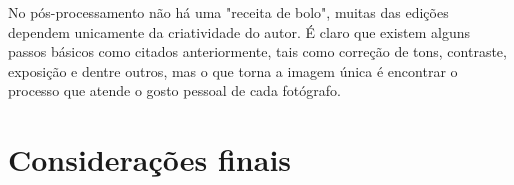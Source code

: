 \documentclass[
	article,			%
	12pt,				%
	oneside,			%
	a4paper,			%
	english,			%
	brazil,				%
	sumario=tradicional
	]{abntex2}
\begin{document}
No pós-processamento não há uma "receita de bolo", muitas das edições dependem unicamente da criatividade do autor. É claro que existem alguns passos básicos como citados anteriormente, tais como correção de tons, contraste, exposição e dentre outros, mas o que torna a imagem única é encontrar o processo que atende o gosto pessoal de cada fotógrafo. 

% 

\section*{Considerações finais}

\lipsum[1]

\begin{citacao}
\lipsum[2]
\end{citacao}

\lipsum[3]
\newpage
\postextual


\end{document}
